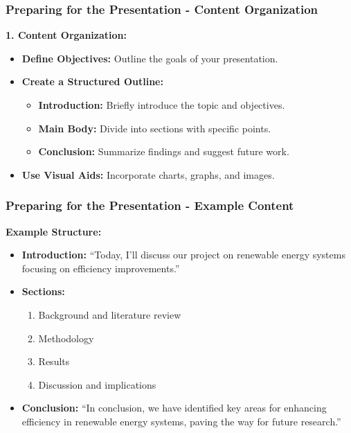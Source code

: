 \documentclass{beamer}
\begin{document}
\begin{frame}[fragile]
    \frametitle{Preparing for the Presentation - Content Organization}
    \textbf{1. Content Organization:}
    \begin{itemize}
        \item \textbf{Define Objectives:} Outline the goals of your presentation.
        \item \textbf{Create a Structured Outline:}
            \begin{itemize}
                \item \textbf{Introduction:} Briefly introduce the topic and objectives.
                \item \textbf{Main Body:} Divide into sections with specific points.
                \item \textbf{Conclusion:} Summarize findings and suggest future work.
            \end{itemize}
        \item \textbf{Use Visual Aids:} Incorporate charts, graphs, and images.
    \end{itemize}
\end{frame}

\begin{frame}[fragile]
    \frametitle{Preparing for the Presentation - Example Content}
    \textbf{Example Structure:}
    \begin{itemize}
        \item \textbf{Introduction:} “Today, I’ll discuss our project on renewable energy systems focusing on efficiency improvements.”
        \item \textbf{Sections:}
            \begin{enumerate}
                \item Background and literature review
                \item Methodology
                \item Results
                \item Discussion and implications
            \end{enumerate}
        \item \textbf{Conclusion:} “In conclusion, we have identified key areas for enhancing efficiency in renewable energy systems, paving the way for future research.”
    \end{itemize}
\end{frame}
\end{document}
